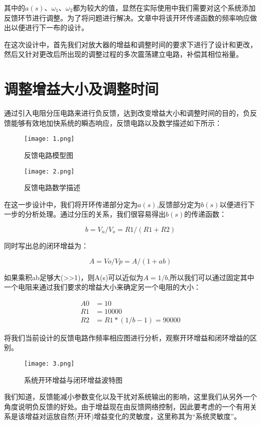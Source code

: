 \documentclass[AutoFakeBold]{LZUThesis}
\begin{document}
其中的$a(s)$、$\omega_1$、$\omega_2$都为较大的值，显然在实际使用中我们需要对这个系统添加反馈环节进行调整。为了将问题进行解决。文章中将该开环传递函数的频率响应做出以便进行下一布的设计。

在这次设计中，首先我们对放大器的增益和调整时间的要求下进行了设计和更改，然后又针对更改后所出现的调整过程的多次震荡建立电路，补偿其相位裕量。

\section{调整增益大小及调整时间}
通过引入电阻分压电路来进行负反馈，达到改变增益大小和调整时间的目的，负反馈能够有效地加快系统的瞬态响应，反馈电路以及数学描述如下所示：

\begin{figure}[htbp]
    \centering
    \texttt{[image: 1.png]}
    \caption{反馈电路模型图}
\end{figure}

\begin{figure}[htbp]
    \centering
    \texttt{[image: 2.png]}
    \caption{反馈电路数学描述}
\end{figure}

在这一步设计中，我们将开环传递部分定为$a(s)$,反馈部分定为$b(s)$以便进行下一步的分析处理。通过分压的关系，我们很容易得出$b(s)$的传递函数：

\begin{equation}
    b=V_n / V_o = R1 / (R1 + R2)
\end{equation}

同时写出总的闭环增益为：

\begin{equation}
    A = Vo / Vp = A / (1 + ab)
\end{equation}

如果乘积ab足够大(>>1)，则A(s)可以近似为$A=1/b$,所以我们可以通过固定其中一个电阻来通过我们要求的增益大小来确定另一个电阻的大小：

\begin{equation}
    \begin{aligned}
    A0 &= 10  \\
    R1 &= 10000 \\
    R2 &= R1 * (1/b - 1)=90000
    \end{aligned}
\end{equation}

将我们当前设计的反馈电路作频率相应图进行分析，观察开环增益和闭环增益的区别。
\begin{figure}[htbp]
    \centering
    \texttt{[image: 3.png]}
    \caption{系统开环增益与闭环增益波特图}
\end{figure}
我们知道，反馈能减小参数变化以及干扰对系统输出的影响，这里我们从另外一个角度说明负反馈的好处。由于增益现在由反馈网络控制，因此要考虑的一个有用关系是该增益对运放自然(开环)增益变化的灵敏度，这里称其为“系统灵敏度”。
\end{document}
